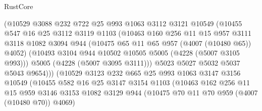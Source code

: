 \begin{lexlean}{RustCore}
\begin{coremodule}
                            (@10529
                              @3088
                              @232
                              @722
                              @25
                              @993
                              @1063
                              @3112
                              @3121
                              @10549
                              (@10455
                                @547
                                @16
                                @25
                                @3112
                                @3119
                                @1103
                                (@10463
                                  @160
                                  @256
                                  @11
                                  @15
                                  @957
                                  @3111
                                  @3118
                                  @1082
                                  @3094
                                  @944
                                  (@10475 @65 @11 @65 @957 (@4007 (@10480 @65)) @4052)
                                  (@10493 @3104 @944 @10502 @10505 @5005 (@4228 (@5007 @3105 @993)))
                                  @5005
                                  (@4228 (@5007 @3095 @3111)))
                                @5023
                                @5027
                                @5032
                                @5037
                                @5043
                                @9654)))
                          (@10529
                            @3123
                            @232
                            @665
                            @25
                            @993
                            @1063
                            @3147
                            @3156
                            @10549
                            (@10455
                              @582
                              @16
                              @25
                              @3147
                              @3154
                              @1103
                              (@10463
                                @162
                                @256
                                @11
                                @15
                                @959
                                @3146
                                @3153
                                @1082
                                @3129
                                @944
                                (@10475 @70 @11 @70 @959 (@4007 (@10480 @70)) @4069)

\end{coremodule}
\end{lexlean}
